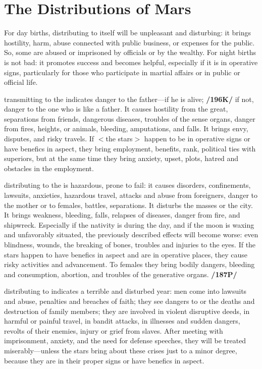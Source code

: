 \section{The Distributions of Mars}

For day births, \Mars\xspace distributing to itself will be unpleasant and disturbing: it brings hostility, harm, abuse connected with public business, or expenses for the public. So, some are abused or imprisoned by officials or by the wealthy. For night births \Mars\xspace is not bad: it promotes success and becomes helpful, especially if it is in operative signs, particularly for those who participate in martial affairs or in public or official life.

\Mars\xspace transmitting to the \Sun\xspace indicates danger to the father—if he is alive; \textbf{/196K/} if not, danger to the one who is like a father. It causes hostility from the great, separations from friends, dangerous diseases, troubles of the sense organs, danger from fires, heights, or animals, bleeding, amputations, and falls. It brings envy, disputes, and risky travels. If $<$the stars$>$ happen to be in operative signs or have benefics in aspect, they bring employment, benefits, rank, political ties with superiors, but at the same time they bring anxiety, upset, plots, hatred and obstacles in the employment.

\Mars\xspace distributing to the \Moon\xspace is hazardous, prone to fail: it causes disorders, confinements, lawsuits,
anxieties, hazardous travel, attacks and abuse from foreigners, danger to the mother or to females, battles, separations. It disturbs the masses or the city. It brings weakness, bleeding, falls, relapses of diseases, danger from fire, and shipwreck. Especially if the nativity is during the day, and if the moon is waxing and unfavorably situated, the previously described effects will become worse: even blindness, wounds, the
breaking of bones, troubles and injuries to the eyes. If the stars happen to have benefics in aspect and are in operative places, they cause risky activities and advancement. To females they bring bodily dangers, bleeding and consumption, abortion, and troubles of the generative organs. \textbf{/187P/}

\Mars\xspace distributing to \Saturn\xspace indicates a terrible and disturbed year: men come into lawsuits and
abuse, penalties and breaches of faith; they see dangers to or the deaths and destruction of family members; they are involved in violent disruptive deeds, in harmful or painful travel, in bandit attacks, in illnesses and sudden dangers, revolts of their enemies, injury or grief from slaves. After meeting with imprisonment, anxiety, and the need for defense speeches, they will be treated miserably—unless the stars bring about these crises just to a minor degree, because they are in their proper signs or have benefics in aspect.

